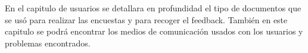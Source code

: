 En el capitulo de usuarios se detallara en profundidad el tipo de documentos que se usó para realizar las encuestas y para recoger el feedback. También en este capitulo se podrá encontrar los medios de comunicación usados con los usuarios y problemas encontrados.























